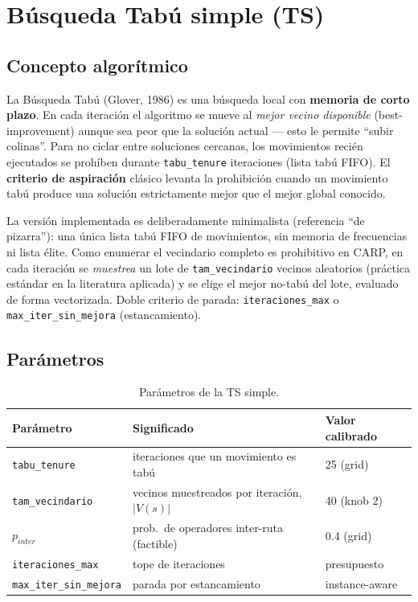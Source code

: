 \section{Búsqueda Tabú simple (TS)}
\label{sec:mh-ts}

\subsection{Concepto algorítmico}
La Búsqueda Tabú (Glover, 1986) es una búsqueda local con \textbf{memoria de
corto plazo}. En cada iteración el algoritmo se mueve al \emph{mejor vecino
disponible} (best-improvement) aunque sea peor que la solución actual ---
esto le permite ``subir colinas''. Para no ciclar entre soluciones cercanas,
los movimientos recién ejecutados se prohíben durante \texttt{tabu\_tenure}
iteraciones (lista tabú FIFO). El \textbf{criterio de aspiración} clásico
levanta la prohibición cuando un movimiento tabú produce una solución
estrictamente mejor que el mejor global conocido.

La versión implementada es deliberadamente minimalista (referencia ``de
pizarra''): una única lista tabú FIFO de movimientos, sin memoria de
frecuencias ni lista élite. Como enumerar el vecindario completo es
prohibitivo en CARP, en cada iteración se \emph{muestrea} un lote de
\texttt{tam\_vecindario} vecinos aleatorios (práctica estándar en la
literatura aplicada) y se elige el mejor no-tabú del lote, evaluado de forma
vectorizada. Doble criterio de parada: \texttt{iteraciones\_max} o
\texttt{max\_iter\_sin\_mejora} (estancamiento).

\subsection{Parámetros}
\begin{table}[htbp]
\centering
\caption{Parámetros de la TS simple.}
\begin{tabular}{lll}
\toprule
Parámetro & Significado & Valor calibrado \\
\midrule
\texttt{tabu\_tenure} & iteraciones que un movimiento es tabú & 25 (grid) \\
\texttt{tam\_vecindario} & vecinos muestreados por iteración, $|V(s)|$ & 40 (knob 2) \\
$p_{inter}$ & prob.\ de operadores inter-ruta (factible) & 0.4 (grid) \\
\texttt{iteraciones\_max} & tope de iteraciones & presupuesto \\
\texttt{max\_iter\_sin\_mejora} & parada por estancamiento & instance-aware \\
\bottomrule
\end{tabular}
\end{table}

